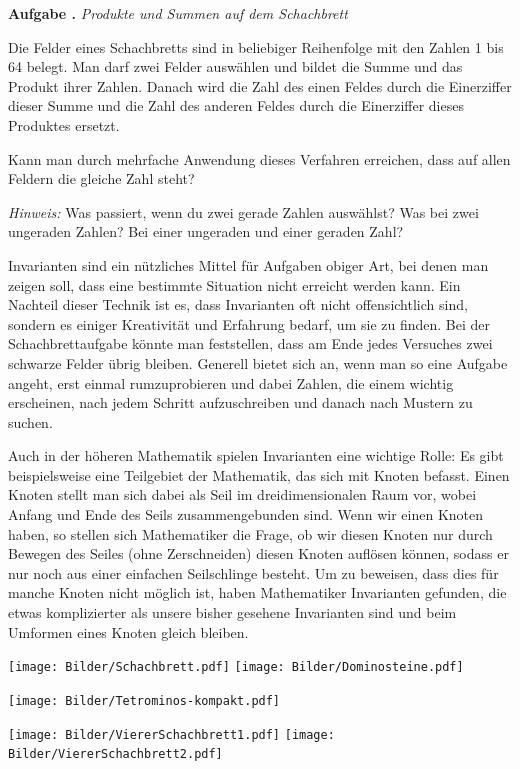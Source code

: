 \documentclass[a4paper,ngerman,12pt]{scrartcl}
\theoremstyle{definition}
\theoremstyle{plain}
\theoremstyle{remark}
\newlength{\aufgabenskip}
\newcounter{aufgabennummer}
\newenvironment{aufgabe}[1]{
	\addtocounter{aufgabennummer}{1}
	\textbf{Aufgabe \theaufgabennummer.} \emph{#1} \par
}{\vspace{\aufgabenskip}}
\begin{document}
\begin{aufgabe}{Produkte und Summen auf dem Schachbrett}
	Die Felder eines Schachbretts sind in beliebiger Reihenfolge mit den Zahlen 1 bis 64 belegt. Man darf zwei Felder auswählen und bildet die Summe und das Produkt ihrer Zahlen. Danach wird die Zahl des einen Feldes durch die Einerziffer dieser Summe und die Zahl des anderen Feldes durch die Einerziffer dieses Produktes ersetzt. 
	
	Kann man durch mehrfache Anwendung dieses Verfahren erreichen, dass auf allen Feldern die gleiche Zahl steht?
	
	\emph{Hinweis: } Was passiert, wenn du zwei gerade Zahlen auswählst? Was bei zwei ungeraden Zahlen? Bei einer ungeraden und einer geraden Zahl?
\end{aufgabe}


Invarianten sind ein nützliches Mittel für Aufgaben obiger Art, bei denen man zeigen soll, dass eine bestimmte Situation nicht erreicht werden kann. Ein Nachteil dieser Technik ist es, dass Invarianten oft nicht offensichtlich sind, sondern es einiger Kreativität und Erfahrung bedarf, um sie zu finden. Bei der Schachbrettaufgabe könnte man feststellen, dass am Ende jedes Versuches zwei schwarze Felder übrig bleiben. Generell bietet sich an, wenn man so eine Aufgabe angeht, erst einmal rumzuprobieren und dabei Zahlen, die einem wichtig erscheinen, nach jedem Schritt aufzuschreiben und danach nach Mustern zu suchen.

Auch in der höheren Mathematik spielen Invarianten eine wichtige Rolle: Es gibt beispielsweise eine Teilgebiet der Mathematik, das sich mit Knoten befasst. Einen Knoten stellt man sich dabei als Seil im dreidimensionalen Raum vor, wobei Anfang und Ende des Seils zusammengebunden sind. Wenn wir einen Knoten haben, so stellen sich Mathematiker die Frage, ob wir diesen Knoten nur durch Bewegen des Seiles (ohne Zerschneiden) diesen Knoten auflösen können, sodass er nur noch aus einer einfachen Seilschlinge besteht. Um zu beweisen, dass dies für manche Knoten nicht möglich ist, haben Mathematiker Invarianten gefunden, die etwas komplizierter als unsere bisher gesehene Invarianten sind und beim Umformen eines Knoten gleich bleiben.

\newpage

\texttt{[image: Bilder/Schachbrett.pdf]}
\texttt{[image: Bilder/Dominosteine.pdf]}

\texttt{[image: Bilder/Tetrominos-kompakt.pdf]}

\texttt{[image: Bilder/ViererSchachbrett1.pdf]}
\texttt{[image: Bilder/ViererSchachbrett2.pdf]}
\end{document}
